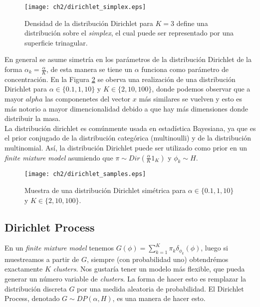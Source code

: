 \documentclass[letterpaper,12pt,oneside]{book} %
\begin{document}
\begin{figure}
    \centering
    \texttt{[image: ch2/dirichlet\_simplex.eps]}
    \caption{Densidad de la distribución Dirichlet para $K=3$ define una distribución sobre el \textit{simplex}, el cual puede ser representado por una superficie trinagular.}
    \label{img:dirichlet_distribution}
\end{figure}

En general se asume simetría en los parámetros de la distribución Dirichlet de la forma $\alpha_{k}=\frac{\alpha}{K}$, de esta manera se tiene un $\alpha$ funciona como parámetro de concentración. En la Figura \ref{img:dirichlet_samples} se oberva una realización de una distribución Dirichlet para $\alpha \in \{0.1, 1, 10\}$ y $K\in\{2, 10, 100\}$, donde podemos observar que a mayor $alpha$ las componenetes del vector $x$ más similares se vuelven y esto es más notorio a mayor dimencionalidad debido a que hay más dimensiones donde distribuir la masa.\\

La distribución dirichlet es comúnmente usada en estadística Bayesiana, ya que es el prior conjugado de la distribución categórica (multinoulli) y de la distribución multinomial. Así, la distribución Dirichlet puede ser utilizado como prior en un \textit{finite mixture model} asumiendo que $\pi\sim Dir(\frac{\alpha}{K}1_{K})$ y $\phi_{k} \sim H$.

\begin{figure}
    \centering
    \texttt{[image: ch2/dirichlet\_samples.eps]}
    \caption{Muestra de una distribución Dirichlet simétrica para $\alpha \in \{0.1, 1, 10\}$ y $K\in\{2, 10, 100\}$.}
    \label{img:dirichlet_samples}
\end{figure}

\subsection{Dirichlet Process}
\label{sec:dp}

En un \textit{finite mixture model} tenemos $G(\phi) = \sum_{k=1}^{K} \pi_{k}\delta_{\phi_{k}}(\phi)$, luego si muestreamos a partir de $G$, siempre (con probabilidad uno) obtendrémos exactamente $K$ \textit{clusters}. Nos gustaría tener un modelo más flexible, que pueda generar un número variable de \textit{clusters}. La forma de hacer esto es remplazar la distribución discreta $G$ por una medida aleatoria de probabilidad. El Dirichlet Process, denotado $G\sim DP(\alpha, H)$, es una manera de hacer esto.\\
\end{document}
